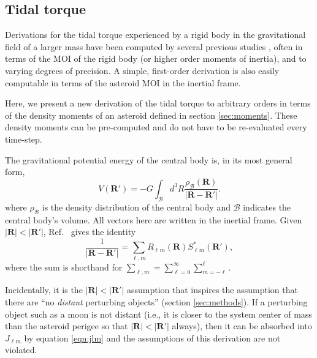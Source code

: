 \subsection{Tidal torque}
\label{sec:tidal-torque}

Derivations for the tidal torque experienced by a rigid body in the gravitational field of a larger mass have been computed by several previous studies \cite{paul88,HouMar2017,BOUE2009750, ashenberg07}, often in terms of the MOI of the rigid body (or higher order moments of inertia), and to varying degrees of precision. A simple, first-order derivation is also easily computable in terms of the asteroid MOI in the inertial frame.

Here, we present a new derivation of the tidal torque to arbitrary orders in terms of the density moments of an asteroid defined in section \ref{sec:moments}. These density moments can be pre-computed and do not have to be re-evaluated every time-step.

The gravitational potential energy of the central body is, in its most general form,
\begin{equation}
V(\bm R') = -G\int_\mathcal{B} d^3 R \frac{\rho_\mathcal{B}(\bm R)}{|\bm{R}-\bm{R'}|}.
\label{eqn:first-pe}
\end{equation}
where $\rho_\mathcal{B}$ is the density distribution of the central body and $\mathcal{B}$ indicates the central body's volume. All vectors here are written in the inertial frame. Given $|\bm{R}| < |\bm{R'}|$, Ref.~\cite{Gelderen1998TheSO} gives the identity
\begin{equation}
  \frac{1}{|\bm R - \bm R'|} = \sum_{\ell, m} R_{\ell m}(\bm R) S_{\ell m}^*(\bm R'),
  \label{eqn:ylm-expansion}
\end{equation}
where the sum is shorthand for $\sum_{\ell, m} = \sum_{\ell = 0}^\infty \sum_{m=-\ell}^\ell$.

Incidentally, it is the $|\bm R| < |\bm R'|$ assumption that inspires the assumption that there are ``no \textit{distant} perturbing objects'' (section \ref{sec:methods}). If a perturbing object such as a moon is not distant (i.e., it is closer to the system center of mass than the asteroid perigee so that $|\bm R| < |\bm R'|$ always), then it can be absorbed into $J_{\ell m}$ by equation \ref{eqn:jlm} and the assumptions of this derivation are not violated.

